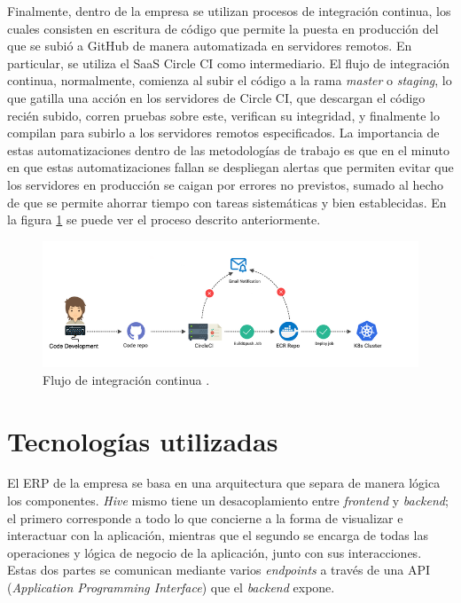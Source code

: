     Finalmente, dentro de la empresa se utilizan procesos de integración continua, los cuales consisten en escritura de código que permite la puesta en producción del que se subió a GitHub de manera automatizada en servidores remotos. En particular, se utiliza el SaaS Circle CI como intermediario. El flujo de integración continua, normalmente, comienza al subir el código a la rama \textit{master} o \textit{staging}, lo que gatilla una acción en los servidores de Circle CI, que descargan el código recién subido, corren pruebas sobre este, verifican su integridad, y finalmente lo compilan para subirlo a los servidores remotos especificados. La importancia de estas automatizaciones dentro de las metodologías de trabajo es que en el minuto en que estas automatizaciones fallan se despliegan alertas que permiten evitar que los servidores en producción se caigan por errores no previstos, sumado al hecho de que se permite ahorrar tiempo con tareas sistemáticas y bien establecidas. En la figura \ref{fig:continuous_integration} se puede ver el proceso descrito anteriormente.
    
    \begin{figure}
        \centering
        \includegraphics[width=0.9\linewidth]{figures/continuous_integration.png}
        \caption{Flujo de integración continua \protect\cite{continuous_integration}.}
        \label{fig:continuous_integration}
    \end{figure}

\section{Tecnologías utilizadas}

    El ERP de la empresa se basa en una arquitectura que separa de manera lógica los componentes. \textit{Hive} mismo tiene un desacoplamiento entre \textit{frontend} y \textit{backend}; el primero corresponde a todo lo que concierne a la forma de visualizar e interactuar con la aplicación, mientras que el segundo se encarga de todas las operaciones y lógica de negocio de la aplicación, junto con sus interacciones. Estas dos partes se comunican mediante varios \textit{endpoints} a través de una API (\textit{Application Programming Interface}) que el \textit{backend} expone. 
    
